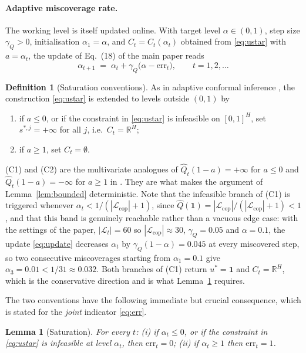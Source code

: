 \documentclass[11pt]{article}
\newtheorem{lemma}[theorem]{Lemma}
\theoremstyle{definition}
\newtheorem{definition}[theorem]{Definition}
\theoremstyle{remark}
\newcommand{\R}{\mathbb{R}}
\newcommand{\Lcop}{\mathcal{L}_{\mathrm{cop}}}
\newcommand{\err}{\mathrm{err}}
\begin{document}
\paragraph{Adaptive miscoverage rate.}
The working level is itself updated online. With target level
$\alpha\in(0,1)$, step size $\gamma_Q>0$, initialisation
$\alpha_1=\alpha$, and $C_t=C_t(\alpha_t)$ obtained from
\eqref{eq:ustar} with $a=\alpha_t$, the update of Eq.~(18) of the main paper
reads
\begin{equation}
  \alpha_{t+1}\;=\;\alpha_t+\gamma_Q\bigl(\alpha-\err_t\bigr),
  \qquad t=1,2,\dots
  \label{eq:update}
\end{equation}

\begin{definition}[Saturation conventions]
\label{def:conventions}
As in adaptive conformal inference \cite{gibbs2021}, the construction
\eqref{eq:ustar} is extended to levels outside $(0,1)$ by
\begin{enumerate}[label=(C\arabic*),leftmargin=*]
  \item if $a\le 0$, or if the constraint in \eqref{eq:ustar} is infeasible on
        $[0,1]^{H}$, set $s^{*,j}=+\infty$ for all $j$, i.e.\ $C_t=\R^{H}$;
  \item if $a\ge 1$, set $C_t=\emptyset$.
\end{enumerate}
(C1) and (C2) are the multivariate analogues of
$\widehat{Q}_t(1-a)=+\infty$ for $a\le 0$ and
$\widehat{Q}_t(1-a)=-\infty$ for $a\ge 1$ in \cite[Sec.~2]{gibbs2021}. They are
what makes the argument of Lemma~\ref{lem:bounded} deterministic. Note that the
infeasible branch of (C1) is triggered whenever
$\alpha_t<1/(|\Lcop|+1)$, since $\widehat{Q}(\boldsymbol{1})
=|\Lcop|/(|\Lcop|+1)<1$, and that this band is genuinely reachable rather than a
vacuous edge case: with the settings of the paper, $|\mathcal{L}_t|=60$ so
$|\Lcop|\approx 30$, $\gamma_Q=0.05$ and $\alpha=0.1$, the update
\eqref{eq:update} decreases $\alpha_t$ by $\gamma_Q(1-\alpha)=0.045$ at every
miscovered step, so two consecutive miscoverages starting from $\alpha_1=0.1$
give $\alpha_3=0.01<1/31\approx 0.032$. Both branches of (C1) return
$u^{*}=\boldsymbol{1}$ and $C_t=\R^{H}$, which is the conservative direction and
is what Lemma~\ref{lem:saturation} requires.
\end{definition}

The two conventions have the following immediate but crucial consequence, which
is stated for the \emph{joint} indicator \eqref{eq:err}.

\begin{lemma}[Saturation]
\label{lem:saturation}
For every $t$: \; (i) if $\alpha_t\le 0$, or if the constraint in
\eqref{eq:ustar} is infeasible at level $\alpha_t$, then $\err_t=0$; \;
(ii) if $\alpha_t\ge 1$ then $\err_t=1$.
\end{lemma}
\end{document}
